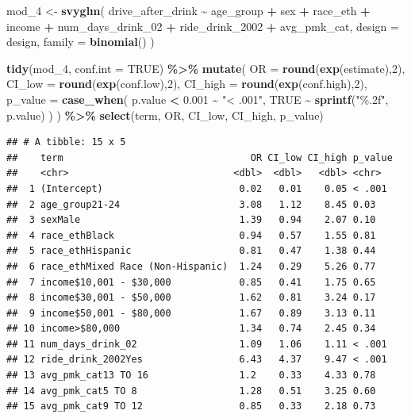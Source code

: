 \documentclass[
]{article}
\newenvironment{Shaded}{\begin{snugshade}}{\end{snugshade}}
\newcommand{\AttributeTok}[1]{\textcolor[rgb]{0.13,0.29,0.53}{#1}}
\newcommand{\ConstantTok}[1]{\textcolor[rgb]{0.56,0.35,0.01}{#1}}
\newcommand{\DecValTok}[1]{\textcolor[rgb]{0.00,0.00,0.81}{#1}}
\newcommand{\FloatTok}[1]{\textcolor[rgb]{0.00,0.00,0.81}{#1}}
\newcommand{\FunctionTok}[1]{\textcolor[rgb]{0.13,0.29,0.53}{\textbf{#1}}}
\newcommand{\NormalTok}[1]{#1}
\newcommand{\OtherTok}[1]{\textcolor[rgb]{0.56,0.35,0.01}{#1}}
\newcommand{\SpecialCharTok}[1]{\textcolor[rgb]{0.81,0.36,0.00}{\textbf{#1}}}
\newcommand{\StringTok}[1]{\textcolor[rgb]{0.31,0.60,0.02}{#1}}
\begin{document}
\begin{Shaded}
\begin{Highlighting}[]
\NormalTok{mod\_4 }\OtherTok{\textless{}{-}} \FunctionTok{svyglm}\NormalTok{(}
\NormalTok{ drive\_after\_drink }\SpecialCharTok{\textasciitilde{}}\NormalTok{ age\_group }\SpecialCharTok{+}\NormalTok{ sex }\SpecialCharTok{+}\NormalTok{ race\_eth }\SpecialCharTok{+}\NormalTok{ income }\SpecialCharTok{+} 
\NormalTok{     num\_days\_drink\_02 }\SpecialCharTok{+}\NormalTok{ ride\_drink\_2002 }\SpecialCharTok{+}
\NormalTok{    avg\_pmk\_cat,}
  \AttributeTok{design =}\NormalTok{ design,}
  \AttributeTok{family =} \FunctionTok{binomial}\NormalTok{()}
\NormalTok{) }

\FunctionTok{tidy}\NormalTok{(mod\_4, }\AttributeTok{conf.int =} \ConstantTok{TRUE}\NormalTok{) }\SpecialCharTok{\%\textgreater{}\%}
  \FunctionTok{mutate}\NormalTok{(}
    \AttributeTok{OR =} \FunctionTok{round}\NormalTok{(}\FunctionTok{exp}\NormalTok{(estimate),}\DecValTok{2}\NormalTok{),}
    \AttributeTok{CI\_low =} \FunctionTok{round}\NormalTok{(}\FunctionTok{exp}\NormalTok{(conf.low),}\DecValTok{2}\NormalTok{),}
    \AttributeTok{CI\_high =} \FunctionTok{round}\NormalTok{(}\FunctionTok{exp}\NormalTok{(conf.high),}\DecValTok{2}\NormalTok{),}
    \AttributeTok{p\_value =} \FunctionTok{case\_when}\NormalTok{(}
\NormalTok{      p.value }\SpecialCharTok{\textless{}} \FloatTok{0.001} \SpecialCharTok{\textasciitilde{}} \StringTok{"\textless{} .001"}\NormalTok{,}
      \ConstantTok{TRUE} \SpecialCharTok{\textasciitilde{}} \FunctionTok{sprintf}\NormalTok{(}\StringTok{"\%.2f"}\NormalTok{, p.value)}
\NormalTok{    )}
\NormalTok{  ) }\SpecialCharTok{\%\textgreater{}\%}
  \FunctionTok{select}\NormalTok{(term, OR, CI\_low, CI\_high, p\_value)}
\end{Highlighting}
\end{Shaded}

\begin{verbatim}
## # A tibble: 15 x 5
##    term                                 OR CI_low CI_high p_value
##    <chr>                             <dbl>  <dbl>   <dbl> <chr>  
##  1 (Intercept)                        0.02   0.01    0.05 < .001 
##  2 age_group21-24                     3.08   1.12    8.45 0.03   
##  3 sexMale                            1.39   0.94    2.07 0.10   
##  4 race_ethBlack                      0.94   0.57    1.55 0.81   
##  5 race_ethHispanic                   0.81   0.47    1.38 0.44   
##  6 race_ethMixed Race (Non-Hispanic)  1.24   0.29    5.26 0.77   
##  7 income$10,001 - $30,000            0.85   0.41    1.75 0.65   
##  8 income$30,001 - $50,000            1.62   0.81    3.24 0.17   
##  9 income$50,001 - $80,000            1.67   0.89    3.13 0.11   
## 10 income>$80,000                     1.34   0.74    2.45 0.34   
## 11 num_days_drink_02                  1.09   1.06    1.11 < .001 
## 12 ride_drink_2002Yes                 6.43   4.37    9.47 < .001 
## 13 avg_pmk_cat13 TO 16                1.2    0.33    4.33 0.78   
## 14 avg_pmk_cat5 TO 8                  1.28   0.51    3.25 0.60   
## 15 avg_pmk_cat9 TO 12                 0.85   0.33    2.18 0.73
\end{verbatim}
\end{document}

